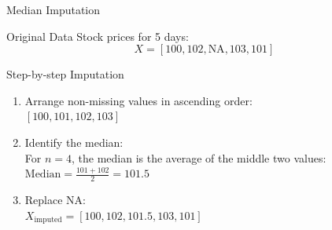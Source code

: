 \documentclass{beamer}
\begin{document}
\begin{frame}{Median Imputation}
   \begin{block}{Original Data}
       Stock prices for 5 days:
       \[
       X = [100, 102, \text{NA}, 103, 101]
       \]
   \end{block}

   \begin{block}{Step-by-step Imputation}
       \begin{enumerate}
           \item Arrange non-missing values in ascending order:\\
           $[100, 101, 102, 103]$
           \item Identify the median:\\
           For $n=4$, the median is the average of the middle two values:\\
           $\text{Median} = \frac{101 + 102}{2} = 101.5$
           \item Replace NA:\\
           $X_{\text{imputed}} = [100, 102, \mathbf{101.5}, 103, 101]$
       \end{enumerate}
   \end{block}
\end{frame}
\end{document}

